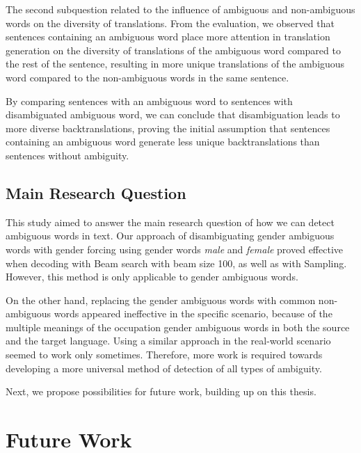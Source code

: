 The second subquestion related to the influence of ambiguous and non-ambiguous words on the diversity of translations. From the evaluation, we observed that sentences containing an ambiguous word place more attention in translation generation on the diversity of translations of the ambiguous word compared to the rest of the sentence, resulting in more unique translations of the ambiguous word compared to the non-ambiguous words in the same sentence.

By comparing sentences with an ambiguous word to sentences with disambiguated ambiguous word, we can conclude that disambiguation leads to more diverse backtranslations, proving the initial assumption that sentences containing an ambiguous word generate less unique backtranslations than sentences without ambiguity. 

\subsection{Main Research Question} %
\label{sec:Discussion:Answers:Main}

This study aimed to answer the main research question of how we can detect ambiguous words in text. Our approach of disambiguating gender ambiguous words with gender forcing using gender words \textit{male} and \textit{female} proved effective when decoding with Beam search with beam size 100, as well as with Sampling. However, this method is only applicable to gender ambiguous words.

On the other hand, replacing the gender ambiguous words with common non-ambiguous words appeared ineffective in the specific scenario, because of the multiple meanings of the occupation gender ambiguous words in both the source and the target language. Using a similar approach in the real-world scenario seemed to work only sometimes. Therefore, more work is required towards developing a more universal method of detection of all types of ambiguity.

Next, we propose possibilities for future work, building up on this thesis.

\section{Future Work}
\label{sec:Conclusion:Future}

